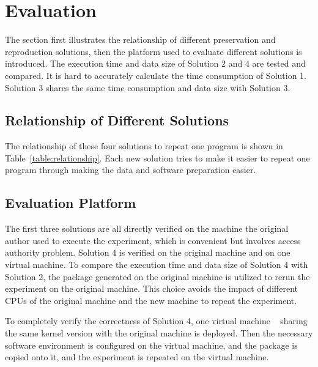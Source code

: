 \documentclass{acm_proc_article-sp}
\begin{document}

\section{Evaluation}
The section first illustrates the relationship of different preservation and reproduction solutions, then the platform used to evaluate different solutions is introduced. The execution time and data size of Solution 2 and 4 are tested and compared. It is hard to accurately calculate the time consumption of Solution 1. Solution 3 shares the same time consumption and data size with Solution 3.

\subsection{Relationship of Different Solutions}
The relationship of these four solutions to repeat one program is shown in Table~\ref{table:relationship}. Each new solution tries to make it easier to repeat one program through making the data and software preparation easier.

\subsection{Evaluation Platform}

The first three solutions are all directly verified on the machine the original
author used to execute the experiment, which is convenient but involves access
authority problem. Solution 4 is verified on the original machine and on one virtual machine.
To compare the execution time and data size of Solution 4
with Solution 2, the package generated on the original machine is utilized to
rerun the experiment on the original machine. This choice avoids the impact of
different CPUs of the original machine and the new machine to repeat the
experiment. 

To completely verify the correctness of Solution 4, one virtual
machine ~\cite{goldberg1974survey} sharing the same kernel version with the original machine is deployed.
Then the necessary software environment is configured on the virtual machine,
and the package is copied onto it, and the
experiment is repeated on the virtual machine.
\end{document}
